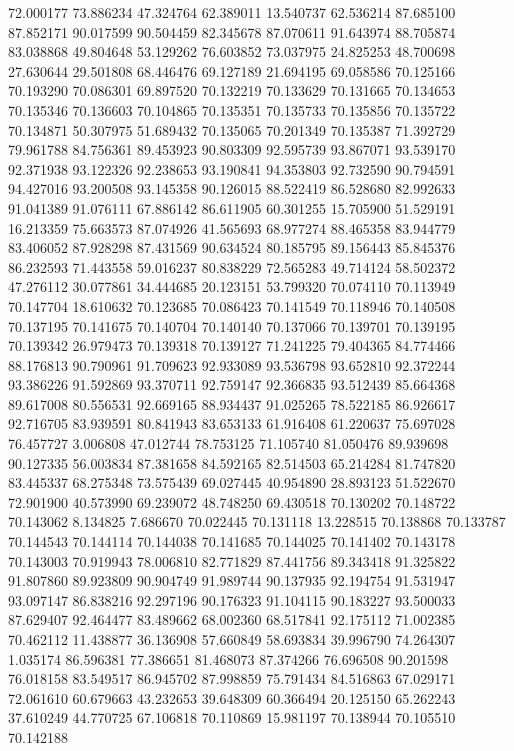 72.000177
73.886234
47.324764
62.389011
13.540737
62.536214
87.685100
87.852171
90.017599
90.504459
82.345678
87.070611
91.643974
88.705874
83.038868
49.804648
53.129262
76.603852
73.037975
24.825253
48.700698
27.630644
29.501808
68.446476
69.127189
21.694195
69.058586
70.125166
70.193290
70.086301
69.897520
70.132219
70.133629
70.131665
70.134653
70.135346
70.136603
70.104865
70.135351
70.135733
70.135856
70.135722
70.134871
50.307975
51.689432
70.135065
70.201349
70.135387
71.392729
79.961788
84.756361
89.453923
90.803309
92.595739
93.867071
93.539170
92.371938
93.122326
92.238653
93.190841
94.353803
92.732590
90.794591
94.427016
93.200508
93.145358
90.126015
88.522419
86.528680
82.992633
91.041389
91.076111
67.886142
86.611905
60.301255
15.705900
51.529191
16.213359
75.663573
87.074926
41.565693
68.977274
88.465358
83.944779
83.406052
87.928298
87.431569
90.634524
80.185795
89.156443
85.845376
86.232593
71.443558
59.016237
80.838229
72.565283
49.714124
58.502372
47.276112
30.077861
34.444685
20.123151
53.799320
70.074110
70.113949
70.147704
18.610632
70.123685
70.086423
70.141549
70.118946
70.140508
70.137195
70.141675
70.140704
70.140140
70.137066
70.139701
70.139195
70.139342
26.979473
70.139318
70.139127
71.241225
79.404365
84.774466
88.176813
90.790961
91.709623
92.933089
93.536798
93.652810
92.372244
93.386226
91.592869
93.370711
92.759147
92.366835
93.512439
85.664368
89.617008
80.556531
92.669165
88.934437
91.025265
78.522185
86.926617
92.716705
83.939591
80.841943
83.653133
61.916408
61.220637
75.697028
76.457727
3.006808
47.012744
78.753125
71.105740
81.050476
89.939698
90.127335
56.003834
87.381658
84.592165
82.514503
65.214284
81.747820
83.445337
68.275348
73.575439
69.027445
40.954890
28.893123
51.522670
72.901900
40.573990
69.239072
48.748250
69.430518
70.130202
70.148722
70.143062
8.134825
7.686670
70.022445
70.131118
13.228515
70.138868
70.133787
70.144543
70.144114
70.144038
70.141685
70.144025
70.141402
70.143178
70.143003
70.919943
78.006810
82.771829
87.441756
89.343418
91.325822
91.807860
89.923809
90.904749
91.989744
90.137935
92.194754
91.531947
93.097147
86.838216
92.297196
90.176323
91.104115
90.183227
93.500033
87.629407
92.464477
83.489662
68.002360
68.517841
92.175112
71.002385
70.462112
11.438877
36.136908
57.660849
58.693834
39.996790
74.264307
1.035174
86.596381
77.386651
81.468073
87.374266
76.696508
90.201598
76.018158
83.549517
86.945702
87.998859
75.791434
84.516863
67.029171
72.061610
60.679663
43.232653
39.648309
60.366494
20.125150
65.262243
37.610249
44.770725
67.106818
70.110869
15.981197
70.138944
70.105510
70.142188
